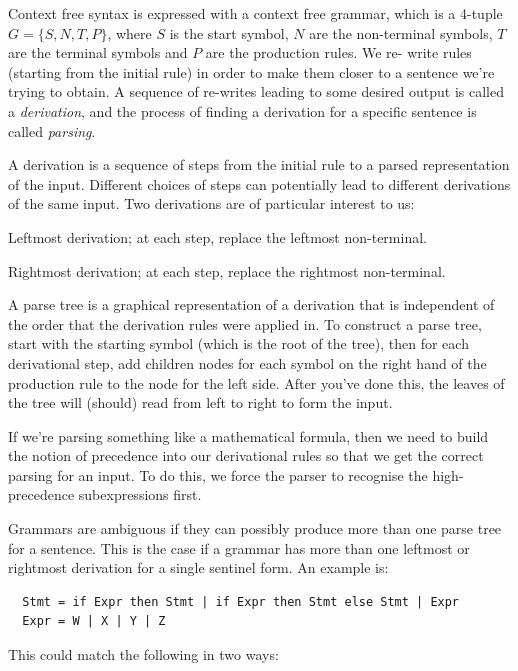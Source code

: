 Context free syntax is expressed with a context free grammar, which is a 4-tuple
$G = \{S,N,T,P\}$, where $S$ is the start symbol, $N$ are the non-terminal
symbols, $T$ are the terminal symbols and $P$ are the production rules. We re-
write rules (starting from the initial rule) in order to make them closer to a
sentence we're trying to obtain. A sequence of re-writes leading to some desired
output is called a \textit{derivation}, and the process of finding a derivation
for a specific sentence is called \textit{parsing}.

A derivation is a sequence of steps from the initial rule to a parsed
representation of the input. Different choices of steps can potentially lead to
different derivations of the same input. Two derivations are of particular
interest to us:

\begin{description}
  \item Leftmost derivation; at each step, replace the leftmost non-terminal.
  \item Rightmost derivation; at each step, replace the rightmost non-terminal.
\end{description}

A parse tree is a graphical representation of a derivation that is independent
of the order that the derivation rules were applied in. To construct a parse
tree, start with the starting symbol (which is the root of the tree), then for
each derivational step, add children nodes for each symbol on the right hand of
the production rule to the node for the left side. After you've done this, the
leaves of the tree will (should) read from left to right to form the input.

If we're parsing something like a mathematical formula, then we need to build
the notion of precedence into our derivational rules so that we get the correct
parsing for an input. To do this, we force the parser to recognise the high-
precedence subexpressions first.

Grammars are ambiguous if they can possibly produce more than one parse tree for
a sentence. This is the case if a grammar has more than one leftmost or
rightmost derivation for a single sentinel form. An example is:

\begin{verbatim}
  Stmt = if Expr then Stmt | if Expr then Stmt else Stmt | Expr
  Expr = W | X | Y | Z
\end{verbatim}

This could match the following in two ways:

